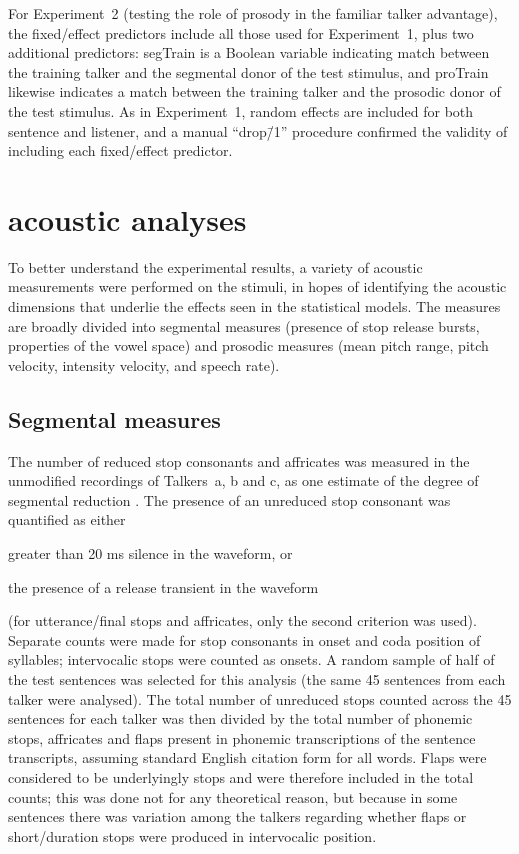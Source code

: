 For Experiment~2 (testing the role of prosody in the familiar talker advantage), the fixed\-/effect predictors include all those used for Experiment~1, plus two additional predictors: {\inlinecode segTrain} is a Boolean variable indicating match between the training talker and the segmental donor of the test stimulus, and {\inlinecode proTrain} likewise indicates a match between the training talker and the prosodic donor of the test stimulus.  As in Experiment~1, random effects are included for both sentence and listener, and a manual “drop\=/1” procedure confirmed the validity of including each fixed\-/effect predictor.

\section{\Ph{} acoustic analyses}
To better understand the experimental results, a variety of acoustic measurements were performed on the stimuli, in hopes of identifying the acoustic dimensions that underlie the effects seen in the statistical models.  The measures are broadly divided into segmental measures (presence of stop release bursts, properties of the vowel space) and prosodic measures (mean pitch range, pitch velocity, intensity velocity, and speech rate).

\subsection{Segmental measures}
The number of reduced stop consonants and affricates was measured in the unmodified recordings of Talkers~\ac{a}, \ac{b} and \ac{c}, as one estimate of the degree of segmental reduction \citep[cf.]{PichenyEtAl1986, LiLoizou2008}.  The presence of an unreduced stop consonant was quantified as either 
\begin{inparaenum}[(a)]
	\item greater than 20 ms silence in the waveform, or 
	\item the presence of a release transient in the waveform 
\end{inparaenum}
(for utterance\-/final stops and affricates, only the second criterion was used).  Separate counts were made for stop consonants in onset and coda position of syllables; intervocalic stops were counted as onsets.  A random sample of half of the test sentences was selected for this analysis (the same 45 sentences from each talker were analysed).  The total number of unreduced stops counted across the 45 sentences for each talker was then divided by the total number of phonemic stops, affricates and flaps present in phonemic transcriptions of the sentence transcripts, assuming standard English citation form for all words.  Flaps were considered to be underlyingly stops and were therefore included in the total counts; this was done not for any theoretical reason, but because in some sentences there was variation among the talkers regarding whether flaps or short\-/duration stops were produced in intervocalic position.   

